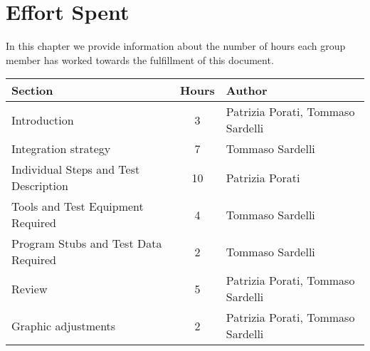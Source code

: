 \pagebreak
\section{Effort Spent}

In this chapter we provide information about the number of hours each group member has worked towards the fulfillment of this document.

\begin{center}
	\vspace{0.2cm}
	\begin{tabular}{ l c l } 
		\hline
		Section 					& Hours & Author \\ 
		\hline
		Introduction								& 3 	& Patrizia Porati, Tommaso Sardelli	\\
		Integration strategy						& 7 	& Tommaso Sardelli	\\
		Individual Steps and Test Description 		& 10 	& Patrizia Porati \\ 
		Tools and Test Equipment Required 			& 4	 	& Tommaso Sardelli \\
		Program Stubs and Test Data Required		& 2		& Tommaso Sardelli \\
		Review										& 5		& Patrizia Porati, Tommaso Sardelli	\\
		Graphic adjustments     				    & 2		& Patrizia Porati, Tommaso Sardelli	\\
		\hline
	\end{tabular}
\end{center}
